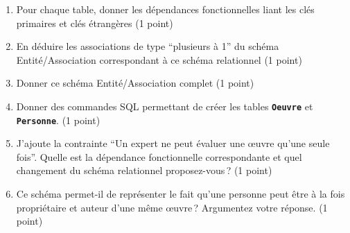 \begin{enumerate}

\item Pour chaque table, donner les dépendances fonctionnelles liant les clés primaires et clés étrangères (1 point)

\item En déduire les associations de type  ``plusieurs à 1'' du schéma Entité/Association correspondant à ce schéma 
    relationnel (1 point)

\item Donner ce schéma Entité/Association complet (1 point)


\item Donner des commandes SQL permettant de créer les tables
\texttt{\textbf{Oeuvre}} et \texttt{\textbf{Personne}}. (1 point) 
  
 \item J'ajoute la contrainte ``Un expert ne peut évaluer une {\oe}uvre qu'une 
    seule fois''. Quelle est la dépendance fonctionnelle correspondante
     et quel changement du schéma relationnel proposez-vous\,?  (1 point) 
     
    \item Ce schéma permet-il de représenter le fait qu'une personne peut être à la fois  propriétaire et auteur d'une
    même  {\oe}uvre\,? Argumentez votre réponse.
     (1 point) 


\end{enumerate}

